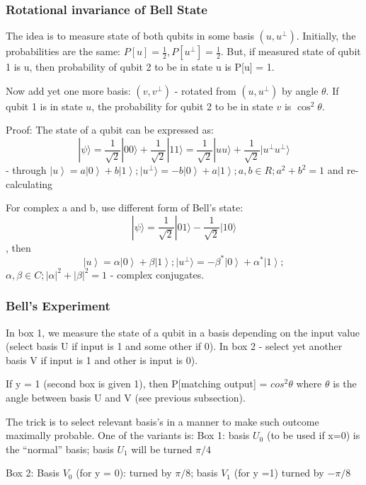\documentclass{scrartcl}
\newcommand{\ket}[1]{\left| #1 \right>} %
\begin{document}
\subsubsection{Rotational invariance of Bell State}
\label{sec:4-2-1}

The idea is to measure state of both qubits in some basis $(u, u^{\perp})$.
Initially, the probabilities are the same: $P[u] = \frac1{2}, P[u^{\perp}] =
\frac1{2}$. But, if measured state of qubit 1 is u, then probability of qubit 2
to be in state u is P[u] = 1.

Now add yet one more basis: $(v, v^{\perp})$ - rotated from $(u, u^{\perp})$ by
angle $\theta$. If qubit 1 is in state $u$, the probability for qubit 2 to be in
state $v$ is $\cos^2 \theta$.

Proof: The state of a qubit can be expressed as: $$|\psi\rangle =
\frac1{\sqrt{2}} |00\rangle + \frac1{\sqrt{2}}|11\rangle = \frac1{\sqrt{2}}
|uu\rangle + \frac1{\sqrt{2}}|u^{\perp}u^{\perp}\rangle$$ - through $\ket u = a
\ket0 + b \ket1;|u^{\perp}\rangle = -b \ket0 + a \ket1; a, b \in R; a^2 + b^2 =
1$ and re-calculating

For complex a and b, use different form of Bell's state: $$ |\psi\rangle =
\frac1{\sqrt{2}} | 01 \rangle - \frac1{\sqrt{2}} | 10 \rangle $$, then $$\ket u
= \alpha \ket0 + \beta \ket1; |u^{\perp}\rangle = -\beta^* \ket0 + \alpha^*
\ket1;$$ $ \alpha, \beta \in C; |\alpha|^2 + |\beta|^2 = 1$ - complex
conjugates.

\subsubsection{Bell's Experiment}
\label{sec:4-3}

In box 1, we measure the state of a qubit in a basis depending on the input
value (select basis U if input is 1 and some other if 0). In box 2 - select yet
another basis V if input is 1 and other is input is 0).

If y = 1 (second box is given 1), then P[matching output] = $cos^2 \theta$ where
$\theta$ is the angle between basis U and V (see previous subsection).

The trick is to select relevant basis's in a manner to make such outcome
maximally probable. One of the variants is: Box 1: basis $U_0$ (to be used if
x=0) is the ``normal'' basis; basis $U_1$ will be turned $\pi / 4$

Box 2: Basis $V_0$ (for y = 0): turned by $\pi /8$; basis $V_1$ (for y =1)
turned by $ - \pi / 8$
\end{document}
